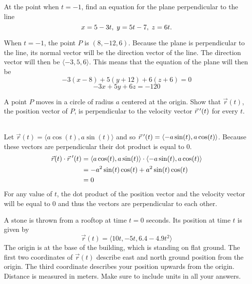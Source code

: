 \documentclass[12pt,letterpaper, onecolumn]{exam}
\begin{document}
\begin{questions}
\begin{solution}
		\end{solution}
		\question At the point when $t=-1$, find an equation for the plane perpendicular to the line
		$$x=5-3t,\hspace*{0.10cm}y=5t-7,\hspace*{0.10cm}z=6t.$$
		\begin{solution}
			When $t=-1$, the point $P$ is $(8,-12,6)$. Because the plane is perpendicular to the line, its normal vector will be the direction vector of the line. The direction vector will then be $\langle -3,5,6 \rangle$. This means that the equation of the plane will then be 
			$$-3(x-8)+5(y+12)+6(z+6)=0$$
			$$-3x+5y+6z=-120$$
		\end{solution}
		\question A point $P$ moves in a circle of radius $a$ centered at the origin. Show that $\vec{r}(t)$, the position vector of $P$, is perpendicular to the velocity vector $\vec{r}\hspace*{0.08cm}'(t)$ for every $t$.
		\begin{solution}\\
			Let $\vec{r}(t)=\langle a\cos(t),a\sin(t)\rangle$ and so $\vec{r}\hspace*{0.08cm}'(t)=\langle -a\sin(t),a\cos(t)\rangle$. Because these vectors are perpendicular their dot product is equal to 0. 
			\begin{align*}
				\vec{r}(t)\cdot\vec{r}\hspace*{0.08cm}'(t)&=\langle a\cos(t),a\sin(t)\rangle\cdot\langle -a\sin(t),a\cos(t)\rangle\\
				&=-a^2\sin(t)\cos(t)+a^2\sin(t)\cos(t)\\
				&=0
			\end{align*}
			For any value of $t$, the dot product of the position vector and the velocity vector will be equal to 0 and thus the vectors are perpendicular to each other. 
		\end{solution}
		\question A stone is thrown from a rooftop at time $t=0$ seconds. Its position at time $t$ is given by
		$$\vec{r}(t)=\langle10t,-5t,6.4-4.9t^2\rangle$$
		The origin is at the base of the building, which is standing on flat ground. The first two coordinates of $\vec{r}(t)$ describe east and north ground position from the origin. The third coordinate describes your position upwards from the origin. Distance is measured in meters. Make sure to include units in all your answers.
		\begin{parts}

\end{parts}
\end{questions}
\end{document}
